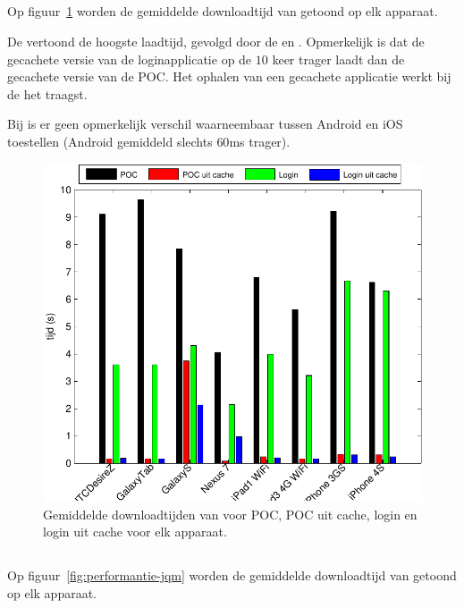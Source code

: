 \subsection{\kendo}
Op figuur~\ref{fig:performantie-kendo} worden de gemiddelde downloadtijd van \kendo{} getoond op elk apparaat.

De \gtab{} vertoond de hoogste laadtijd,  gevolgd door de \iphoneiii{} en \htc.
Opmerkelijk is dat de gecachete versie van de loginapplicatie op de \nexus{} $10$ keer trager laadt dan de gecachete versie van de POC.
Het ophalen van een gecachete applicatie werkt bij de \gs{} het traagst.

Bij \kendo{} is er geen opmerkelijk verschil waarneembaar tussen Android en iOS toestellen (Android gemiddeld slechts $60$ms trager).

\begin{figure}[H]
  \centering
  \includegraphics[width=\textwidth]{figuren/performance-kendo.pdf}
  \caption{Gemiddelde downloadtijden van \kendo{} voor POC,  POC uit cache,  login en login uit cache voor elk apparaat.}
  \label{fig:performantie-kendo}
\end{figure}

\subsection{\jqm}
Op figuur~\ref{fig:performantie-jqm} worden de gemiddelde downloadtijd van \jqm{} getoond op elk apparaat.

